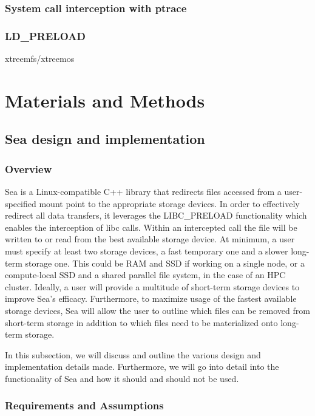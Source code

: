 \documentclass[10pt,journal,compsoc]{IEEEtran}
\begin{document}
\subsubsection{System call interception with ptrace}
\subsubsection{LD\_PRELOAD}
xtreemfs/xtreemos

\section{Materials and Methods}

\subsection{Sea design and implementation}
\subsubsection{Overview}

Sea is a Linux-compatible C++ library that redirects files accessed from a user-specified mount point to the
appropriate storage devices. In order to effectively redirect all data transfers, it leverages the LIBC\_PRELOAD functionality which
enables the interception of libc calls. Within an intercepted call the file will be written to or read
from the best available storage device. At minimum, a user must specify at least two storage devices, a fast
temporary one and a slower long-term storage one. This could be RAM and SSD if working on a single node, or a compute-local SSD
and a shared parallel file system, in the case of an HPC cluster. Ideally, a user will provide a multitude of short-term storage
devices to improve Sea's efficacy. Furthermore, to maximize usage of the fastest available
storage devices, Sea will allow the user to outline which files can be removed from short-term storage in addition
to which files need to be materialized onto long-term storage.

In this subsection, we will discuss and outline the various design and implementation details made. Furthermore,
we will go into detail into the functionality of Sea and how it should and should not be used.

\subsubsection{Requirements and Assumptions}
\end{document}
